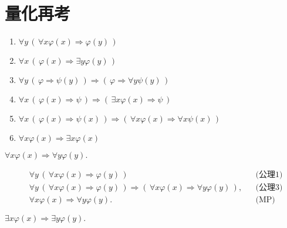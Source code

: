 \section{量化再考}
	\begin{screen}
		\begin{logicalaxm}[量化の公理]\mbox{}
			\begin{enumerate}
				\item $\forall y\, \left(\, \forall x \varphi(x) \Longrightarrow \varphi(y)\, \right)$
				\item $\forall x\, \left(\, \varphi(x) \Longrightarrow \exists y \varphi(y)\, \right)$
				\item $\forall y\, \left(\, \varphi \Longrightarrow \psi(y)\, \right)
					\Longrightarrow \left(\, \varphi \Longrightarrow \forall y \psi(y)\, \right)$
				\item $\forall x\, \left(\, \varphi(x) \Longrightarrow \psi\, \right)
					\Longrightarrow \left(\, \exists x \varphi(x) \Longrightarrow \psi\, \right)$
				\item $\forall x\,  \left(\, \varphi(x) \Longrightarrow \psi(x)\, \right)
					\Longrightarrow \left(\, \forall x \varphi(x) \Longrightarrow \forall x \psi(x)\, \right)$
			
				\item $\forall x \varphi(x) \Longrightarrow \exists x \varphi(x)$	
			\end{enumerate}
		\end{logicalaxm}
	\end{screen}
	
	\begin{screen}
		$\forall x \varphi(x) \Longrightarrow \forall y \varphi(y).$
	\end{screen}
	
	\begin{align}
		&\forall y\, \left(\, \forall x \varphi(x) \Longrightarrow \varphi(y)\, \right)
		&& \mbox{(公理1)} \\
		&\forall y\, \left(\, \forall x \varphi(x) \Longrightarrow \varphi(y)\, \right)
		\Longrightarrow \left(\, \forall x \varphi(x) \Longrightarrow \forall y \varphi(y)\, \right),
		&& \mbox{(公理3)} \\
		&\forall x \varphi(x) \Longrightarrow \forall y \varphi(y).
		&& \mbox{(MP)}
	\end{align}
	
	\begin{screen}
		$\exists x \varphi(x) \Longrightarrow \exists y \varphi(y).$
	\end{screen}
	

